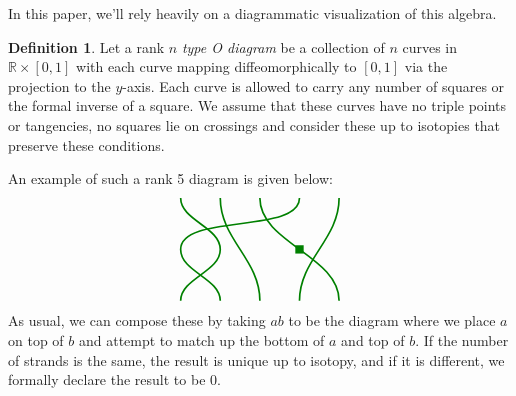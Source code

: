 \documentclass[10pt]{article}
\theoremstyle{definition}
\newtheorem{defi}[theorem]{Definition}
\newcommand{\R}{\mathbb{R}}
\begin{document}
In this paper, we'll rely heavily on a diagrammatic visualization of
this algebra.
\begin{defi}
 Let a rank $n$ \emph{type O diagram} be a collection of $n$ curves in
 $\R\times [0,1]$ with each curve mapping diffeomorphically to
 $[0,1]$ via the projection to the $y$-axis. Each curve is allowed
 to carry any number of squares or the formal inverse of a square.
 We assume that these curves have no triple points or tangencies, no
 squares lie on crossings and consider these up to isotopies that
 preserve these conditions.
\end{defi}
An example of such a rank 5 diagram is given below:
\[
\begin{tikzpicture}[baseline,very thick,green!50!black, xscale=2,yscale=1.3]
 \draw (-.5,-1) to[out=90,in=-90] (-1,0) to[out=90,in=-90](.5,1);
 \draw (.5,-1) to[out=90,in=-90] (1,1);
 \draw (1,-1) to[out=90,in=-90] 
 node[midway,fill=green!50!black,inner sep=3pt]{} (0,1);
 \draw (-1, -1) to[out=90,in=-90] (-.5,0) to[out=90,in=-90] (-1,1);
 \draw (0,-1) to[out=90,in=-90] (-.5,1);
\end{tikzpicture}\]
As usual, we can compose these by taking $ab$ to be the diagram where
we place $a$ on top of $b$ and attempt to match up the bottom of $a$
and top of $b$. If the number of strands is the same, the result is
unique up to isotopy, and if it is different, we formally declare the
result to be $0$.
\end{document}
